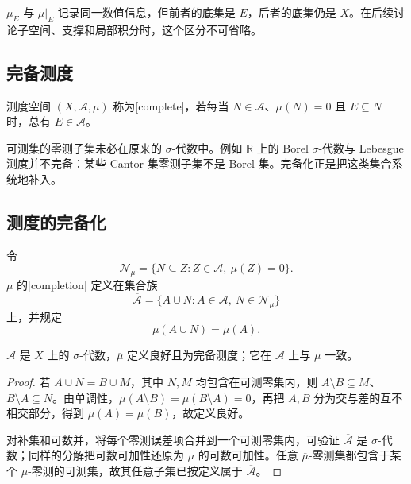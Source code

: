 \(\mu_E\) 与 \(\mu|_E\) 记录同一数值信息，但前者的底集是 \(E\)，后者的底集仍是 \(X\)。在后续讨论子空间、支撑和局部积分时，这个区分不可省略。

\subsection{完备测度}
\label{b1:subsec:020203}

\begin{definition}
\label{b1:def:complete-measure}
测度空间 \((X,\mathcal A,\mu)\) 称为[complete]，若每当 \(N\in\mathcal A\)、\(\mu(N)=0\) 且 \(E\subseteq N\) 时，总有 \(E\in\mathcal A\)。
\end{definition}

可测集的零测子集未必在原来的 \(\sigma\)-代数中。例如 \(\mathbb R\) 上的 Borel \(\sigma\)-代数与 Lebesgue 测度并不完备：某些 Cantor 集零测子集不是 Borel 集。完备化正是把这类集合系统地补入。

\subsection{测度的完备化}
\label{b1:subsec:020204}

\begin{definition}
\label{b1:def:completion}
令
\[
\mathcal N_\mu
=\{N\subseteq Z:Z\in\mathcal A,\ \mu(Z)=0\}.
\]
\(\mu\) 的[completion] 定义在集合族
\[
\overline{\mathcal A}
=\{A\cup N:A\in\mathcal A,\ N\in\mathcal N_\mu\}
\]
上，并规定
\[
\overline\mu(A\cup N)=\mu(A).
\]
\end{definition}

\begin{theorem}
\label{b1:thm:completion-measure}
\(\overline{\mathcal A}\) 是 \(X\) 上的 \(\sigma\)-代数，\(\overline\mu\) 定义良好且为完备测度；它在 \(\mathcal A\) 上与 \(\mu\) 一致。
\end{theorem}
\begin{proof}
若 \(A\cup N=B\cup M\)，其中 \(N,M\) 均包含在可测零集内，则 \(A\setminus B\subseteq M\)、\(B\setminus A\subseteq N\)。由单调性，\(\mu(A\setminus B)=\mu(B\setminus A)=0\)，再把 \(A,B\) 分为交与差的互不相交部分，得到 \(\mu(A)=\mu(B)\)，故定义良好。

对补集和可数并，将每个零测误差项合并到一个可测零集内，可验证 \(\overline{\mathcal A}\) 是 \(\sigma\)-代数；同样的分解把可数可加性还原为 \(\mu\) 的可数可加性。任意 \(\overline\mu\)-零测集都包含于某个 \(\mu\)-零测的可测集，故其任意子集已按定义属于 \(\overline{\mathcal A}\)。
\end{proof}

